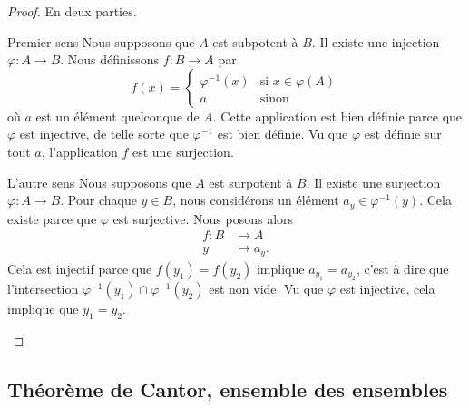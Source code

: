 \begin{proof}
    En deux parties.
    \begin{subproof}
        \item[Premier sens]
            Nous supposons que \( A\) est subpotent à \( B\). Il existe une injection \( \varphi\colon A\to B\). Nous définissons \( f\colon B\to A\) par
            \begin{equation}
                f(x)=\begin{cases}
                    \varphi^{-1}(x)    &   \text{si } x\in\varphi(A)\\
                    a    &    \text{sinon } 
                \end{cases}
            \end{equation}
            où \( a\) est un élément quelconque de \( A\). Cette application est bien définie parce que \( \varphi\) est injective, de telle sorte que \( \varphi^{-1}\) est bien définie. Vu que \( \varphi\) est définie sur tout \( a\), l'application \( f\) est une surjection.
        \item[L'autre sens]
            Nous supposons que \( A\) est surpotent à \( B\). Il existe une surjection \( \varphi\colon A\to B\). Pour chaque \( y\in B\), nous considérons un élément \( a_y\in \varphi^{-1}(y)\). Cela existe parce que \( \varphi\) est surjective. Nous posons alors
            \begin{equation}
                \begin{aligned}
                    f\colon B&\to A \\
                    y&\mapsto a_y. 
                \end{aligned}
            \end{equation}
            Cela est injectif parce que \( f(y_1)=f(y_2)\) implique \( a_{y_1}=a_{y_2}\), c'est à dire que l'intersection \( \varphi^{-1}(y_1)\cap\varphi^{-1}(y_2)\) est non vide. Vu que \( \varphi\) est injective, cela implique que $y_1=y_2$.
    \end{subproof}
\end{proof}



\subsection{Théorème de Cantor, ensemble des ensembles}

